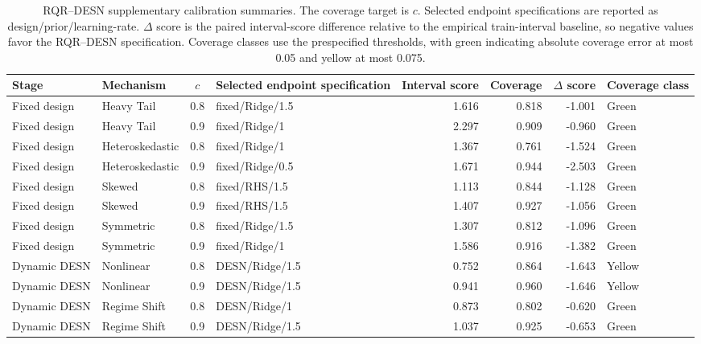 \begin{table}[!htbp]
\centering
\begingroup
\TableStyle
\begin{tabular}{@{}llclrrrl@{}}
\toprule
Stage & Mechanism & $c$ & Selected endpoint specification & Interval score & Coverage & $\Delta$ score & Coverage class \\
\midrule
Fixed design & Heavy Tail & 0.8 & fixed/Ridge/1.5 & 1.616 & 0.818 & -1.001 & Green \\
Fixed design & Heavy Tail & 0.9 & fixed/Ridge/1 & 2.297 & 0.909 & -0.960 & Green \\
Fixed design & Heteroskedastic & 0.8 & fixed/Ridge/1 & 1.367 & 0.761 & -1.524 & Green \\
Fixed design & Heteroskedastic & 0.9 & fixed/Ridge/0.5 & 1.671 & 0.944 & -2.503 & Green \\
Fixed design & Skewed & 0.8 & fixed/RHS/1.5 & 1.113 & 0.844 & -1.128 & Green \\
Fixed design & Skewed & 0.9 & fixed/RHS/1.5 & 1.407 & 0.927 & -1.056 & Green \\
Fixed design & Symmetric & 0.8 & fixed/Ridge/1.5 & 1.307 & 0.812 & -1.096 & Green \\
Fixed design & Symmetric & 0.9 & fixed/Ridge/1 & 1.586 & 0.916 & -1.382 & Green \\
Dynamic DESN & Nonlinear & 0.8 & DESN/Ridge/1.5 & 0.752 & 0.864 & -1.643 & Yellow \\
Dynamic DESN & Nonlinear & 0.9 & DESN/Ridge/1.5 & 0.941 & 0.960 & -1.646 & Yellow \\
Dynamic DESN & Regime Shift & 0.8 & DESN/Ridge/1 & 0.873 & 0.802 & -0.620 & Green \\
Dynamic DESN & Regime Shift & 0.9 & DESN/Ridge/1.5 & 1.037 & 0.925 & -0.653 & Green \\
\bottomrule
\end{tabular}
\endgroup
\caption{RQR--DESN supplementary calibration summaries. The coverage target is $c$. Selected endpoint specifications are reported as design/prior/learning-rate. $\Delta$ score is the paired interval-score difference relative to the empirical train-interval baseline, so negative values favor the RQR--DESN specification. Coverage classes use the prespecified thresholds, with green indicating absolute coverage error at most 0.05 and yellow at most 0.075.}
\label{tab:rqr-desn-calibration-screened}
\end{table}
